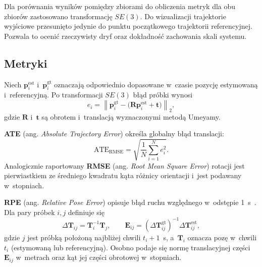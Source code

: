Dla porównania wyników pomiędzy zbiorami do obliczenia metryk dla obu zbiorów zastosowano transformację $SE(3)$.
Do wizualizacji trajektorie wyjściowe przesunięto jedynie do punktu początkowego trajektorii referencyjnej. Pozwala to ocenić rzeczywisty dryf oraz dokładność zachowania skali systemu.

\subsection{Metryki}
\label{subsec:metryki_trajektorii}

Niech $\mathbf{p}_i^{\mathrm{est}}$ i~$\mathbf{p}_i^{\mathrm{gt}}$ oznaczają odpowiednio dopasowane w~czasie pozycję estymowaną i~referencyjną. Po transformacji $SE(3)$ błąd próbki wynosi
\begin{equation}
    e_i=\left\|\mathbf{p}_i^{\mathrm{gt}}-\bigl(\mathbf{R}\mathbf{p}_i^{\mathrm{est}}+\mathbf{t}\bigr)\right\|_2,
    \label{eq:methodology_position_error}
\end{equation}
gdzie $\mathbf{R}$ i~$\mathbf{t}$ są obrotem i~translacją wyznaczonymi metodą Umeyamy.

\textbf{ATE} (ang. \textit{Absolute Trajectory Error}) określa globalny błąd translacji:
\begin{equation}
    \mathrm{ATE_{RMSE}}=\sqrt{\frac{1}{N}\sum_{i=1}^{N}e_i^2}.
    \label{eq:methodology_ate}
\end{equation}
Analogicznie raportowany \textbf{RMSE} (ang. \textit{Root Mean Square Error}) rotacji jest pierwiastkiem ze średniego kwadratu kąta różnicy orientacji i~jest podawany w~stopniach.

\textbf{RPE} (ang. \textit{Relative Pose Error}) opisuje błąd ruchu względnego w~odstępie 1~s~\cite{sturm2012benchmark}. Dla pary próbek $i, j$ definiuje się
\begin{equation}
    \Delta\mathbf{T}_{ij}=\mathbf{T}_i^{-1}\mathbf{T}_j,
    \qquad
    \mathbf{E}_{ij}=\left(\Delta\mathbf{T}_{ij}^{\mathrm{gt}}\right)^{-1}\Delta\mathbf{T}_{ij}^{\mathrm{est}},
    \label{eq:methodology_rpe}
\end{equation}
gdzie $j$ jest próbką położoną najbliżej chwili $t_i+1$~s, a~$\mathbf{T}_i$ oznacza pozę w~chwili $t_i$ (estymowaną lub referencyjną). Osobno podaje się normę translacyjnej części $\mathbf{E}_{ij}$ w~metrach oraz kąt jej części obrotowej w~stopniach.


